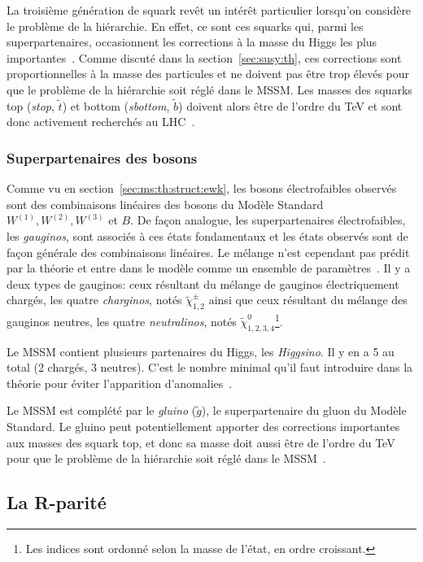 La troisième génération de squark revêt un intérêt particulier
lorsqu'on considère le problème de la hiérarchie. En effet, ce sont
ces squarks qui, parmi les superpartenaires, occasionnent les
corrections à la masse du Higgs les plus
importantes~\cite{olive_susy2_2014}. Comme discuté dans la
section~\ref{sec:susy:th}, ces corrections sont proportionnelles à la
masse des particules et ne doivent pas être trop élevés pour que le
problème de la hiérarchie soit réglé dans le MSSM. Les masses des
squarks top (\emph{stop}, $\tilde{t}$) et bottom (\emph{sbottom},
$\tilde{b}$) doivent alors être de l'ordre du TeV et sont donc
activement recherchés au LHC~\cite{ATLAS-CONF-2015-067}.

\subsubsection{Superpartenaires des bosons}
Comme vu en section~\ref{sec:ms:th:struct:ewk}, les bosons
électrofaibles observés sont des combinaisons linéaires des bosons du
Modèle Standard $W^{(1)}, W^{(2)}, W^{(3)}$ et $B$. De façon analogue,
les superpartenaires électrofaibles, les \emph{gauginos}, sont
associés à ces états fondamentaux et les états observés sont de façon
générale des combinaisons linéaires. Le mélange n'est cependant pas
prédit par la théorie et entre dans le modèle comme un ensemble de
paramètres~\cite{olive_susy1_2014}. Il y a deux types de gauginos:
ceux résultant du mélange de gauginos électriquement chargés, les
quatre \emph{charginos}, notés $\tilde{\chi}_{1,2}^\pm$ ainsi que ceux
résultant du mélange des gauginos neutres, les quatre
\emph{neutralinos}, notés $\tilde{\chi}_{1,2,3,4}^0$\footnote{Les
  indices sont ordonné selon la masse de l'état, en ordre
  croissant.}\cite{aad_summary_2015}.

Le MSSM contient plusieurs partenaires du Higgs, les
\emph{Higgsino}. Il y en a 5 au total (2 chargés, 3 neutres). C'est le
nombre minimal qu'il faut introduire dans la théorie pour éviter
l'apparition d'anomalies~\cite{olive_susy1_2014}.

Le MSSM est complété par le \emph{gluino} ($\tilde{g}$), le
superpartenaire du gluon du Modèle Standard. Le gluino peut
potentiellement apporter des corrections importantes aux masses des
squark top, et donc sa masse doit aussi être de l'ordre du TeV pour
que le problème de la hiérarchie soit réglé dans le
MSSM~\cite{ATLAS-CONF-2015-067}.

\subsection{La R-parité}
\label{sec:susy:R}

